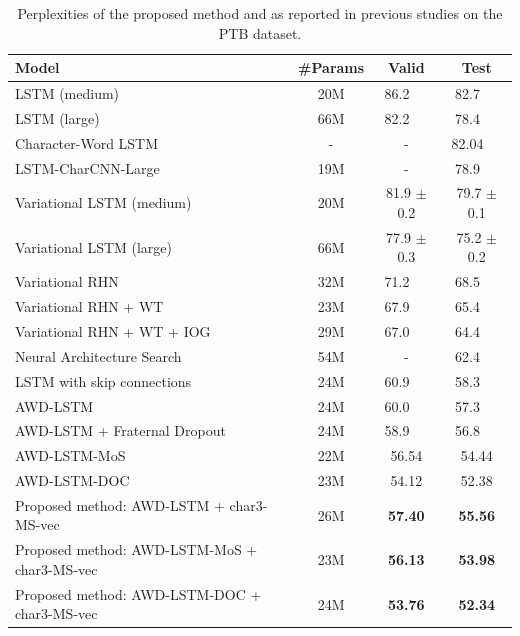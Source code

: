 \documentclass[letterpaper]{article} %
\begin{document}
\begin{table}[!t]
  \centering
  \begin{tabular}{ l  | c | c c }
  \toprule
  Model & \#Params & Valid & Test \\
  \midrule
  LSTM (medium) \cite{DBLP:journals/corr/ZarembaSV14} & 20M & 86.2 \ \  & 82.7 \ \  \\
  LSTM (large) \cite{DBLP:journals/corr/ZarembaSV14} & 66M & 82.2 \ \  & 78.4 \ \  \\
  Character-Word LSTM \cite{verwimp-EtAl:2017:EACLlong} & - & - & 82.04 \ \  \\
  LSTM-CharCNN-Large \cite{Kim:2016:CNL:3016100.3016285} & 19M & - & 78.9 \ \  \\
  Variational LSTM (medium) \cite{Gal2016Theoretically} & 20M & 81.9 $\pm$ 0.2 & 79.7 $\pm$ 0.1 \\
  Variational LSTM (large) \cite{Gal2016Theoretically} & 66M & 77.9 $\pm$ 0.3 & 75.2 $\pm$ 0.2 \\
  Variational RHN \cite{zilly2016recurrent} & 32M & 71.2 \ \  & 68.5 \ \  \\
  Variational RHN + WT \cite{zilly2016recurrent} & 23M & 67.9 \ \  & 65.4 \ \  \\
  Variational RHN + WT + IOG \cite{takase-suzuki-nagata:2017:I17-2} & 29M & 67.0 \ \  & 64.4 \ \  \\
  Neural Architecture Search \cite{45826} & 54M & - & 62.4 \ \  \\
  LSTM with skip connections \cite{DBLP:journals/corr/MelisDB17} & 24M & 60.9 \ \  & 58.3 \ \  \\
  AWD-LSTM \cite{merityRegOpt} & 24M & 60.0 \ \  & 57.3 \ \  \\
  AWD-LSTM + Fraternal Dropout \cite{fraternal} & 24M & 58.9 \ \  & 56.8 \ \  \\
  AWD-LSTM-MoS \cite{DBLP:journals/corr/abs-1711-03953} & 22M & 56.54 & 54.44 \\
  AWD-LSTM-DOC \cite{D18-1489} & 23M & 54.12 & 52.38 \\
  \midrule
  Proposed method: AWD-LSTM + char3-MS-vec & 26M & {\bf 57.40} & {\bf 55.56} \\
  Proposed method: AWD-LSTM-MoS + char3-MS-vec & 23M & {\bf 56.13} & {\bf 53.98} \\
  Proposed method: AWD-LSTM-DOC + char3-MS-vec & 24M & {\bf 53.76} & {\bf 52.34} \\
  \bottomrule
  \end{tabular}
  \caption{Perplexities of the proposed method and as reported in previous studies on the PTB dataset.\label{tb:perplexity}}
\end{table}
\end{document}
